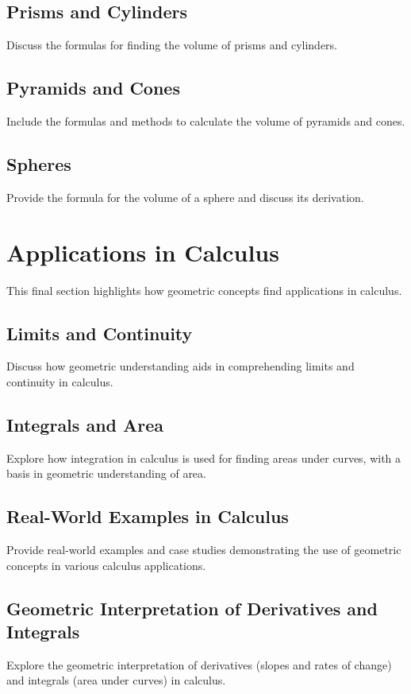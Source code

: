 \documentclass[a4paper,12pt]{book}
\newcounter{example}
\begin{document}
\subsection{Prisms and Cylinders}
\label{subsec:volume_prisms_cylinders}
Discuss the formulas for finding the volume of prisms and cylinders.


\subsection{Pyramids and Cones}
\label{subsec:volume_pyramids_cones}
Include the formulas and methods to calculate the volume of pyramids and cones.


\subsection{Spheres}
\label{subsec:volume_spheres}
Provide the formula for the volume of a sphere and discuss its derivation.


\section{Applications in Calculus}
\label{sec:applications_in_calculus}
This final section highlights how geometric concepts find applications in calculus.


\subsection{Limits and Continuity}
\label{subsec:limits_and_continuity}
Discuss how geometric understanding aids in comprehending limits and continuity in calculus.


\subsection{Integrals and Area}
\label{subsec:integrals_and_area}
Explore how integration in calculus is used for finding areas under curves, with a basis in geometric understanding of area.

\subsection{Real-World Examples in Calculus}
\label{subsec:real_world_examples_calculus}
Provide real-world examples and case studies demonstrating the use of geometric concepts in various calculus applications.


\subsection{Geometric Interpretation of Derivatives and Integrals}
\label{subsec:geometric_interpretation_derivatives_integrals}
Explore the geometric interpretation of derivatives (slopes and rates of change) and integrals (area under curves) in calculus.
\end{document}
